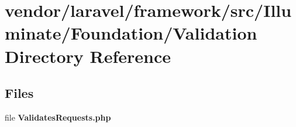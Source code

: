\section{vendor/laravel/framework/src/\+Illuminate/\+Foundation/\+Validation Directory Reference}
\label{dir_538a65d5529786c257d8fc3b6b957ee3}
\subsection*{Files}
\begin{DoxyCompactItemize}
\item 
file {\bf Validates\+Requests.\+php}
\end{DoxyCompactItemize}
